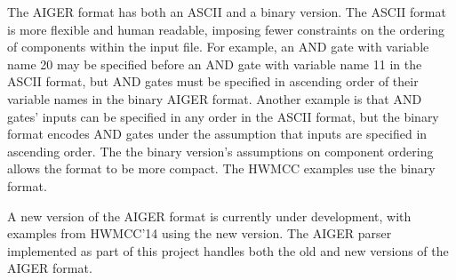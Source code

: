 \documentclass[12pt,a4paper,twoside,openright]{report}
\begin{document}
The AIGER format has both an ASCII and a binary version. The ASCII
format is more flexible and human readable, imposing fewer constraints
on the ordering of components within the input file. For example, an
AND gate with variable name 20 may be specified before an AND gate with
variable name 11 in the ASCII format, but AND gates must be specified in
ascending order of their variable names in the binary AIGER format. Another
example is that AND gates' inputs can be specified in any order in the ASCII
format, but the binary format encodes AND gates under the assumption
that inputs are specified in ascending order.
The the binary version's assumptions on component ordering allows the format
to be more compact. The HWMCC examples use the binary format.

A new version of the AIGER format is currently under development, with
examples from HWMCC'14 using the new version. The AIGER parser implemented
as part of this project handles both the old and new versions of the AIGER
format.
\end{document}
